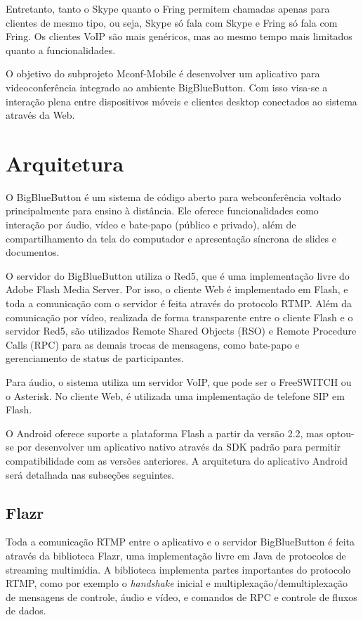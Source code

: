 \documentclass{acm_proc_article-sp}
\begin{document}
Entretanto, tanto o Skype quanto o Fring permitem chamadas apenas para clientes de mesmo tipo, ou seja, Skype só fala com Skype e Fring só fala com Fring. Os clientes VoIP são mais genéricos, mas ao mesmo tempo mais limitados quanto a funcionalidades.

O objetivo do subprojeto Mconf-Mobile é desenvolver um aplicativo para videoconferência integrado ao ambiente BigBlueButton. Com isso visa-se a interação plena entre dispositivos móveis e clientes desktop conectados ao sistema através da Web.

\section{Arquitetura}

O BigBlueButton é um sistema de código aberto para webconferência voltado principalmente para ensino à distância. Ele oferece funcionalidades como interação por áudio, vídeo e bate-papo (público e privado), além de compartilhamento da tela do computador e apresentação síncrona de slides e documentos.

O servidor do BigBlueButton utiliza o Red5, que é uma implementação livre do Adobe Flash Media Server. Por isso, o cliente Web é implementado em Flash, e toda a comunicação com o servidor é feita através do protocolo RTMP. Além da comunicação por vídeo, realizada de forma transparente entre o cliente Flash e o servidor Red5, são utilizados Remote Shared Objects (RSO) e Remote Procedure Calls (RPC) para as demais trocas de mensagens, como bate-papo e gerenciamento de status de participantes.

Para áudio, o sistema utiliza um servidor VoIP, que pode ser o FreeSWITCH ou o Asterisk. No cliente Web, é utilizada uma implementação de telefone SIP em Flash.

O Android oferece suporte a plataforma Flash a partir da versão 2.2, mas optou-se por desenvolver um aplicativo nativo através da SDK padrão para permitir compatibilidade com as versões anteriores. A arquitetura do aplicativo Android será detalhada nas subseções seguintes.

\subsection{Flazr}

Toda a comunicação RTMP entre o aplicativo e o servidor BigBlueButton é feita através da biblioteca Flazr, uma implementação livre em Java de protocolos de streaming multimídia. A biblioteca implementa partes importantes do protocolo RTMP, como por exemplo o \emph{handshake} inicial e multiplexação/demultiplexação de mensagens de controle, áudio e vídeo, e comandos de RPC e controle de fluxos de dados.
\end{document}
